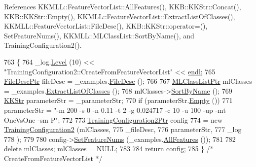 References K\+K\+M\+L\+L\+::\+Feature\+Vector\+List\+::\+All\+Features(), K\+K\+B\+::\+K\+K\+Str\+::\+Concat(), K\+K\+B\+::\+K\+K\+Str\+::\+Empty(), K\+K\+M\+L\+L\+::\+Feature\+Vector\+List\+::\+Extract\+List\+Of\+Classes(), K\+K\+M\+L\+L\+::\+Feature\+Vector\+List\+::\+File\+Desc(), K\+K\+B\+::\+K\+K\+Str\+::operator=(), Set\+Feature\+Nums(), K\+K\+M\+L\+L\+::\+M\+L\+Class\+List\+::\+Sort\+By\+Name(), and Training\+Configuration2().


\begin{DoxyCode}
763 \{
764   \_log.\hyperlink{class_k_k_b_1_1_run_log_a32cf761d7f2e747465fd80533fdbb659}{Level} (10) << \textcolor{stringliteral}{"TrainingConfiguration2::CreateFromFeatureVectorList"} << 
      \hyperlink{namespace_k_k_b_ad1f50f65af6adc8fa9e6f62d007818a8}{endl};
765   \hyperlink{class_k_k_m_l_l_1_1_file_desc}{FileDescPtr}  fileDesc = \_examples.\hyperlink{class_k_k_m_l_l_1_1_feature_vector_list_a736923be9c4ac7553a5aa87dd24efd16}{FileDesc} ();
766 
767   \hyperlink{class_k_k_m_l_l_1_1_m_l_class_list}{MLClassListPtr}  mlClasses = \_examples.\hyperlink{class_k_k_m_l_l_1_1_feature_vector_list_af4bffa9713e7632b9e0e33f931528164}{ExtractListOfClasses} ();
768   mlClasses->\hyperlink{class_k_k_m_l_l_1_1_m_l_class_list_a00b4e0ed01e65ca7e6c21c285ea45c02}{SortByName} ();
769   \hyperlink{class_k_k_b_1_1_k_k_str}{KKStr}  parameterStr = \_parameterStr;
770   \textcolor{keywordflow}{if}  (parameterStr.\hyperlink{class_k_k_b_1_1_k_k_str_ac69942f73fffd672ec2a6e1c410afdb6}{Empty} ())
771     parameterStr = \textcolor{stringliteral}{"-m 200 -s 0 -n 0.11 -t 2 -g 0.024717  -c 10  -u 100  -up  -mt OneVsOne  -sm P"};
772 
773   \hyperlink{class_k_k_m_l_l_1_1_training_configuration2}{TrainingConfiguration2Ptr}  config 
774       = \textcolor{keyword}{new} \hyperlink{class_k_k_m_l_l_1_1_training_configuration2_a30f123ba51f4a4c91f8824fff105ebf3}{TrainingConfiguration2} (mlClasses,
775                                     \_fileDesc,
776                                     parameterStr,
777                                    \_log
778                                   );
779 
780   config->\hyperlink{class_k_k_m_l_l_1_1_training_configuration2_aa1ab3e038551bdf6d0b0e357744d374e}{SetFeatureNums} (\_examples.\hyperlink{class_k_k_m_l_l_1_1_feature_vector_list_a3ba96acb7cd625dc94958da2ae750a08}{AllFeatures} ());
781 
782   \textcolor{keyword}{delete}  mlClasses;  mlClasses = NULL;
783 
784   \textcolor{keywordflow}{return}  config;
785 \}  \textcolor{comment}{/* CreateFromFeatureVectorList */}
\end{DoxyCode}
